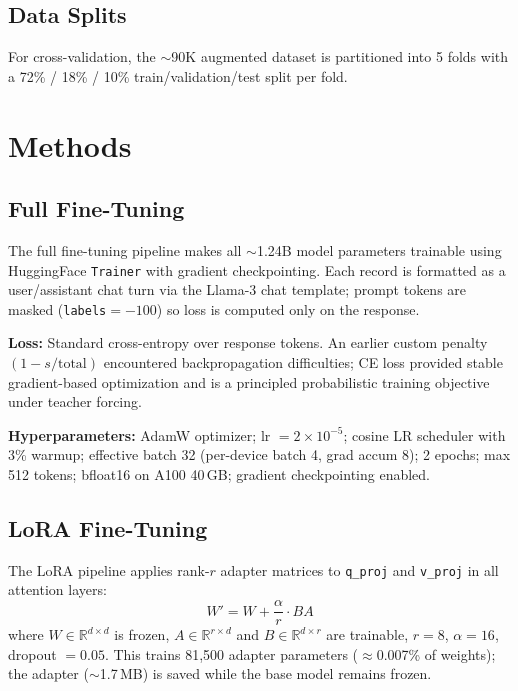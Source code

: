 \documentclass[10pt]{article}
\begin{document}
\subsection{Data Splits}
For cross-validation, the $\sim$90K augmented dataset is partitioned into
5 folds with a 72\% / 18\% / 10\% train/validation/test split per fold.

\section{Methods}

\subsection{Full Fine-Tuning}
The full fine-tuning pipeline makes all $\sim$1.24B model parameters
trainable using HuggingFace \texttt{Trainer} with gradient checkpointing.
Each record is formatted as a user/assistant chat turn via the Llama-3
chat template; prompt tokens are masked (\texttt{labels}$=-100$) so loss
is computed only on the response.

\textbf{Loss:} Standard cross-entropy over response tokens. An earlier
custom penalty $(1 - s/\text{total})$ encountered backpropagation
difficulties; CE loss provided stable gradient-based optimization and is a
principled probabilistic training objective under teacher forcing.

\textbf{Hyperparameters:} AdamW optimizer; lr $= 2{\times}10^{-5}$;
cosine LR scheduler with 3\% warmup; effective batch 32 (per-device batch
4, grad accum 8); 2 epochs; max 512 tokens; bfloat16 on A100 40\,GB;
gradient checkpointing enabled.

\subsection{LoRA Fine-Tuning}
The LoRA pipeline applies rank-$r$ adapter matrices to \texttt{q\_proj}
and \texttt{v\_proj} in all attention layers:
\begin{equation}
  W' = W + \frac{\alpha}{r} \cdot BA
  \label{eq:lora}
\end{equation}
where $W \in \mathbb{R}^{d \times d}$ is frozen, $A \in \mathbb{R}^{r
\times d}$ and $B \in \mathbb{R}^{d \times r}$ are trainable, $r{=}8$,
$\alpha{=}16$, dropout $= 0.05$. This trains 81,500 adapter parameters
($\approx$0.007\% of weights); the adapter ($\sim$1.7\,MB) is saved
while the base model remains frozen.
\end{document}
